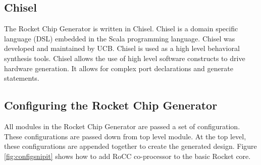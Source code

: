 \documentclass[../main.tex]{subfiles}
\begin{document}
\subsection{Chisel}
The Rocket Chip Generator is written in Chisel. Chisel is a domain specific language (DSL) embedded in the Scala programming language. Chisel was developed and maintained by UCB. Chisel is used as a high level behavioral synthesis tools. Chisel allows the use of high level software constructs to drive hardware generation. It allows for complex port declarations and generate statements.   

\subsection{Configuring the Rocket Chip Generator}
All modules in the Rocket Chip Generator are passed a set of configuration. These configurations are passed down from top level module. At the top level, these configurations are appended together to create the generated design. Figure \ref{fig:configsnipit} shows how to add RoCC co-processor to the basic Rocket core. 
\end{document}
